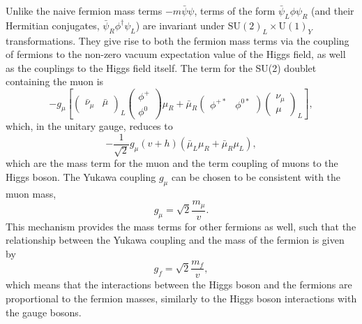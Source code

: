 Unlike the naive fermion mass terms $-m \bar{\psi}\psi$, terms of the form $\bar{\psi}_L\phi\psi_R$
(and their Hermitian conjugates, $\bar{\psi}_R\phi^\dagger\psi_L$)
are invariant under $\text{SU}(2)_L \times \text{U}(1)_Y$ transformations. They give rise to both the
fermion mass terms via the coupling of fermions to the non-zero vacuum expectation value of the Higgs field,
as well as the couplings to the Higgs field itself. The term for the
SU(2) doublet containing the muon is
\begin{equation}
- g_\mu \left[
\begin{pmatrix}
\bar \nu_\mu & \bar \mu
\end{pmatrix}_L
\begin{pmatrix}
\phi^+ \\
\phi^0
\end{pmatrix}
\mu_R
+
\bar{\mu}_R
\begin{pmatrix}
\phi^{+*} & \phi^{0*}
\end{pmatrix}
\begin{pmatrix}
\nu_\mu \\
\mu
\end{pmatrix}_L
\right],
\end{equation}
which, in the unitary gauge, reduces to
\begin{equation}
- \frac{1}{\sqrt{2}} g_\mu (v + h) (\bar{\mu}_L \mu_R + \bar{\mu}_R\mu_L),
\end{equation}
which are the mass term for the muon and the term coupling of muons to
the Higgs boson. The Yukawa coupling $g_\mu$ can be chosen to be consistent
with the muon mass,
\begin{equation}
g_\mu = \sqrt{2}\frac{m_\mu}{v}.
\end{equation}
This mechanism provides the mass terms for other fermions as well,
such that the relationship between the Yukawa coupling and the mass of the
fermion is given by
\begin{equation}
g_f = \sqrt{2}\frac{m_f}{v},
\end{equation}
which means that the interactions between the Higgs boson and the
fermions are proportional to the fermion masses, similarly to the
Higgs boson interactions with the gauge bosons.

